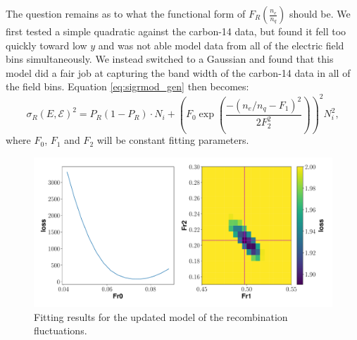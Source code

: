 The question remains as to what the functional form of $F_{R}(\frac{n_e}{n_q})$ should be. We first tested a simple quadratic against the carbon-14 data, but found it fell too quickly toward low $y$ and was not able model data from all of the electric field bins simultaneously. We instead switched to a Gaussian and found that this model did a fair job at capturing the band width of the carbon-14 data in all of the field bins. Equation \ref{eq:sigrmod_gen} then becomes:
\begin{equation}\label{eq:sigrmod}
\sigma_{R}(E,\mathcal{E})^2=P_{R}(1-P_{R})\cdot N_i +\left(F_0\exp \left(\frac{-(n_e/n_q-F_1)^2}{2F_2^2}\right)\right)^2N_i^2,
\end{equation}
where $F_0$, $F_1$ and $F_2$ will be constant fitting parameters.
\begin{figure}[h!]
\centering
  \includegraphics[width=\textwidth]{Figures/sigR_fit_gfdcm.pdf}
\caption{Fitting results for the updated model of the recombination fluctuations.}
\label{fig:sigrfit}
\end{figure}

